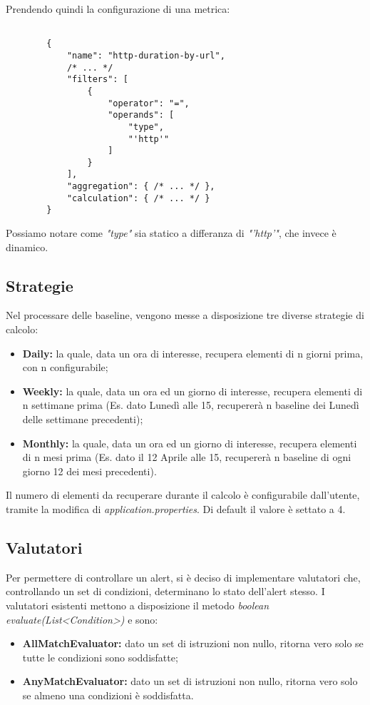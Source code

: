 		Prendendo quindi la configurazione di una metrica:
		\begin{lstlisting}[style=json]

		{
			"name": "http-duration-by-url",
			/* ... */
			"filters": [
				{
					"operator": "=",
					"operands": [
						"type",
						"'http'"
					]
				}
			],
			"aggregation": { /* ... */ },
			"calculation": { /* ... */ }
		}
		\end{lstlisting}

		Possiamo notare come \textit{"type"} sia statico a differanza di \textit{"'http'"}, che invece è dinamico.

    \subsection{Strategie}

	Nel processare delle baseline, vengono messe a disposizione tre diverse strategie di calcolo:
	\begin{itemize}
                \item \textbf{Daily:} la quale, data un ora di interesse, recupera elementi di n giorni prima, con n configurabile;
		\item \textbf{Weekly:} la quale, data un ora ed un giorno di interesse, recupera elementi di n settimane prima (Es. dato Lunedì alle 15, recupererà n baseline dei Lunedì delle settimane precedenti);
		\item \textbf{Monthly:} la quale, data un ora ed un giorno di interesse, recupera elementi di n mesi prima (Es. dato il 12 Aprile alle 15, recupererà n baseline di ogni giorno 12 dei mesi precedenti).
	\end{itemize}

	Il numero di elementi da recuperare durante il calcolo è configurabile dall'utente, tramite la modifica di \textit{application.properties}. Di default il valore è settato a 4.

    \subsection{Valutatori}

	Per permettere di controllare un alert, si è deciso di implementare valutatori che, controllando un set di condizioni, determinano lo stato dell'alert stesso.
	I valutatori esistenti mettono a disposizione il metodo \textit{boolean evaluate(List\textless{}Condition\textgreater{})} e sono:
	\begin{itemize}
                \item \textbf{AllMatchEvaluator:} dato un set di istruzioni non nullo, ritorna vero solo se tutte le condizioni sono soddisfatte;
		\item \textbf{AnyMatchEvaluator:} dato un set di istruzioni non nullo, ritorna vero solo se almeno una condizioni è soddisfatta.
	\end{itemize}

